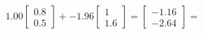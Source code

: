 \documentclass[preview]{standalone}
\begin{document}
\begin{align*}
1.00 \begin{bmatrix} 0.8 \\ 0.5 \end{bmatrix} + -1.96 \begin{bmatrix} 1 \\ 1.6 \end{bmatrix} = \begin{bmatrix} -1.16 \\ -2.64 \end{bmatrix} =
\end{align*}
\end{document}
